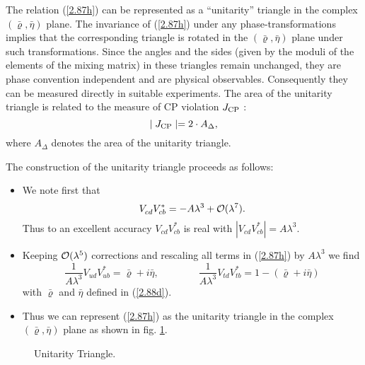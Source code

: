 \documentclass[12pt]{article}
\newcommand{\bi}{\begin{itemize}}
\newcommand{\ei}{\end{itemize}}
\newcommand{\ord}{{\cal O}}
\begin{document}
\begin{itemize}
The relation (\ref{2.87h})  can be
represented as a ``unitarity'' triangle in the complex 
$(\bar\varrho,\bar\eta)$ plane. 
The invariance of (\ref{2.87h})  under any phase-transformations
implies that the  corresponding triangle
is rotated in the $(\bar\varrho,\bar\eta)$  plane under such transformations. 
Since the angles and the sides
(given by the moduli of the elements of the
mixing matrix)  in these triangles remain unchanged, they
 are phase convention independent and are  physical observables.
Consequently they can be measured directly in suitable experiments.  
The area of the unitarity triangle  is related to the measure of CP violation 
$J_{\rm CP}$ \cite{js}:
\begin{equation}
\mid J_{\rm CP} \mid = 2\cdot A_{\Delta},
\end{equation}
where $A_{\Delta}$ denotes the area of the unitarity triangle.

The construction of the unitarity triangle proceeds as follows:

\bi
\item
We note first that
\begin{equation}\label{2.88a}
V_{cd}^{}V_{cb}^*=-A\lambda^3+\ord(\lambda^7).
\end{equation}
%
Thus to an excellent accuracy $V_{cd}^{}V_{cb}^*$ is real with
$| V_{cd}^{}V_{cb}^*|=A\lambda^3$.
\item
Keeping $\ord(\lambda^5)$ corrections and rescaling all terms in
(\ref{2.87h})
by $A \lambda^3$ 
we find
\begin{equation}\label{2.88b}
 \frac{1}{A\lambda^3}V_{ud}^{}V_{ub}^*
=\bar\varrho+i\bar\eta,
\qquad
\qquad
 \frac{1}{A\lambda^3}V_{td}^{}V_{tb}^*
=1-(\bar\varrho+i\bar\eta)
\end{equation}
with $\bar\varrho$ and $\bar\eta$ defined in (\ref{2.88d}). 
\item
Thus we can represent (\ref{2.87h}) as the unitarity triangle 
in the complex $(\bar\varrho,\bar\eta)$ plane 
as shown in fig. \ref{fig:utriangle}.
\ei

\begin{figure}[hbt]
\vspace{0.10in}
\centerline{
\epsfysize=2.1in
}
\vspace{0.08in}
\caption{Unitarity Triangle.}\label{fig:utriangle}
\end{figure}


\end{itemize}
\end{document}
